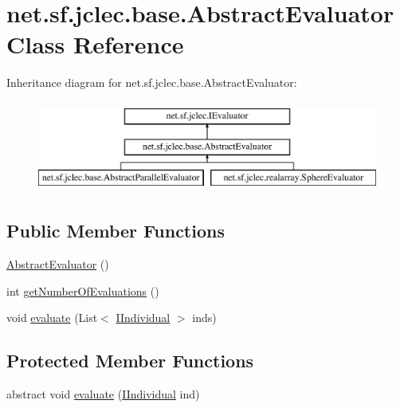 \hypertarget{classnet_1_1sf_1_1jclec_1_1base_1_1_abstract_evaluator}{\section{net.\-sf.\-jclec.\-base.\-Abstract\-Evaluator Class Reference}
\label{classnet_1_1sf_1_1jclec_1_1base_1_1_abstract_evaluator}
}
Inheritance diagram for net.\-sf.\-jclec.\-base.\-Abstract\-Evaluator\-:\begin{figure}[H]
\begin{center}
\leavevmode
\includegraphics[height=3.000000cm]{classnet_1_1sf_1_1jclec_1_1base_1_1_abstract_evaluator}
\end{center}
\end{figure}
\subsection*{Public Member Functions}
\begin{DoxyCompactItemize}
\item 
\hyperlink{classnet_1_1sf_1_1jclec_1_1base_1_1_abstract_evaluator_a3f8105ac25e482fec118d58aa6bd9db6}{Abstract\-Evaluator} ()
\item 
int \hyperlink{classnet_1_1sf_1_1jclec_1_1base_1_1_abstract_evaluator_a4bf8163d0769193b1d92327d29cf3247}{get\-Number\-Of\-Evaluations} ()
\item 
void \hyperlink{classnet_1_1sf_1_1jclec_1_1base_1_1_abstract_evaluator_a33398832b681b02d99b739c51fef4acb}{evaluate} (List$<$ \hyperlink{interfacenet_1_1sf_1_1jclec_1_1_i_individual}{I\-Individual} $>$ inds)
\end{DoxyCompactItemize}
\subsection*{Protected Member Functions}
\begin{DoxyCompactItemize}
\item 
abstract void \hyperlink{classnet_1_1sf_1_1jclec_1_1base_1_1_abstract_evaluator_ab268ad679c75a9612d262cc957976471}{evaluate} (\hyperlink{interfacenet_1_1sf_1_1jclec_1_1_i_individual}{I\-Individual} ind)
\end{DoxyCompactItemize}


